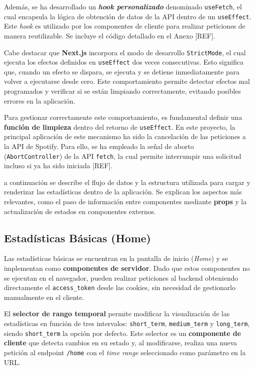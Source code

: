 Además, se ha desarrollado un \textbf{\textit{hook personalizado}} denominado \texttt{useFetch}, el cual encapsula la lógica de obtención de datos de la API dentro de un \texttt{useEffect}. Este \textit{hook} es utilizado por los componentes de cliente para realizar peticiones de manera reutilizable. Se incluye el código detallado en el Anexo [REF].

Cabe destacar que \textbf{Next.js} incorpora el modo de desarrollo \texttt{StrictMode}, el cual ejecuta los efectos definidos en \texttt{useEffect} dos veces consecutivas. Esto significa que, cuando un efecto se dispara, se ejecuta y se detiene inmediatamente para volver a ejecutarse desde cero. Este comportamiento permite detectar efectos mal programados y verificar si se están limpiando correctamente, evitando posibles errores en la aplicación.

Para gestionar correctamente este comportamiento, es fundamental definir una \textbf{función de limpieza} dentro del retorno de \texttt{useEffect}. En este proyecto, la principal aplicación de este mecanismo ha sido la cancelación de las peticiones a la API de Spotify. Para ello, se ha empleado la señal de aborto (\texttt{AbortController}) de la API \texttt{fetch}, la cual permite interrumpir una solicitud incluso si ya ha sido iniciada [REF].

a continuación se describe el flujo de datos y la estructura utilizada para cargar y renderizar las estadísticas dentro de la aplicación. Se explican los aspectos más relevantes, como el paso de información entre componentes mediante \textbf{props} y la actualización de estados en componentes externos.

\subsection{Estadísticas Básicas (Home)}

Las estadísticas básicas se encuentran en la pantalla de inicio (\textit{Home}) y se implementan como \textbf{componentes de servidor}. Dado que estos componentes no se ejecutan en el navegador, pueden realizar peticiones al backend obteniendo directamente el \texttt{access\_token} desde las cookies, sin necesidad de gestionarlo manualmente en el cliente.

El \textbf{selector de rango temporal} permite modificar la visualización de las estadísticas en función de tres intervalos: \texttt{short\_term}, \texttt{medium\_term} y \texttt{long\_term}, siendo \texttt{short\_term} la opción por defecto. Este selector es un \textbf{componente de cliente} que detecta cambios en su estado y, al modificarse, realiza una nueva petición al endpoint \texttt{/home} con el \textit{time range} seleccionado como parámetro en la URL.

